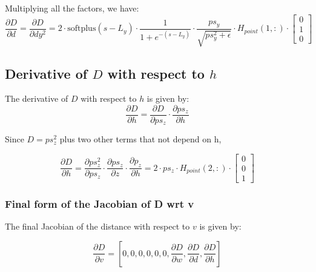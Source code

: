 \documentclass[11pt]{article}
\begin{document}
        Multiplying all the factors, we have:
        \begin{equation}
            \frac{\partial D}{\partial d} = \frac{\partial D}{\partial dy^2}  = 2 \cdot
                                            \text{softplus}(s - L_y) \cdot
                                            \frac{1}{1 + e^{-(s - L_y)}} \cdot
                                            \frac{ps_{y}}{\sqrt{ps_{y}^2 + \epsilon}} \cdot
                                            H_{point}(1,:) \cdot
                                            \begin{bmatrix} 0 \\ 1 \\ 0 \end{bmatrix}
        \end{equation}

    \subsection*{Derivative of $D$ with respect to $h$}
        The derivative of \(D\) with respect to \(h\) is given by:
        \begin{equation}
            \frac{\partial D}{\partial h} = \frac{\partial D}{\partial ps_{z}} \cdot \frac{\partial ps_{z}}{\partial h}
        \end{equation}

        Since $D = ps^2_z$ plus two other terms that not depend on h,

        \begin{equation}
            \frac{\partial D}{\partial h} = \frac{\partial ps^2_{z}}{\partial ps_z} \cdot  \frac{\partial ps_z}{\partial z} \cdot \frac{\partial p_z}{\partial h} = 2 \cdot ps_z \cdot H_{point}(2,:) \cdot \begin{bmatrix} 0 \\ 0 \\ 1 \end{bmatrix}
        \end{equation}

    \subsubsection*{Final form of the Jacobian of D wrt v}
        The final Jacobian of the distance with respect to \(v\) is given by:

        \begin{equation}
            \frac{\partial D}{\partial v} = \left[0,0,0,0,0,0, \frac{\partial D}{\partial w}, \frac{\partial D}{\partial d}, \frac{\partial D}{\partial h}\right]
        \end{equation}
\end{document}
